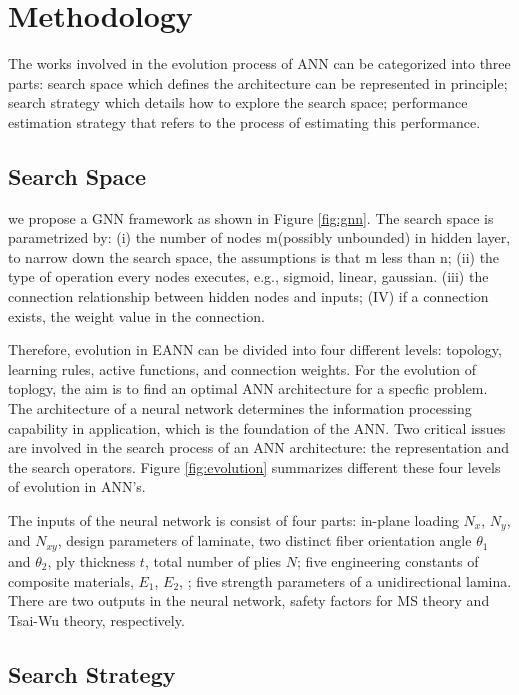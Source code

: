 \section{Methodology}
The works involved in the evolution process of ANN can be categorized into
three parts:  search space which defines the architecture can be represented in
principle; search strategy which details how to explore the search space;
performance estimation strategy that refers to the process of estimating this
performance.


\subsection{Search Space}

we propose a GNN framework as shown in Figure \ref{fig:gnn}. The search space
is parametrized by: (i) the number of nodes m(possibly unbounded) in hidden
layer, to narrow down the search space, the assumptions is that m less than n; (ii) the type of
operation every nodes executes, e.g., sigmoid, linear, gaussian. (iii) the
connection relationship between hidden nodes and inputs; (IV) if a connection
exists, the weight value in the connection.

Therefore, evolution in EANN can be divided into four different levels: topology, learning
rules, active functions, and connection weights. For the evolution of toplogy,
the aim is to find an optimal ANN architecture for a specfic problem. The
architecture of a neural network determines the information processing
capability in application, which is the foundation of the ANN. Two critical
issues are involved in the search process of an ANN architecture: the
representation and the search operators.
Figure \ref{fig:evolution} summarizes different these four levels of evolution in ANN's.

The inputs of the neural network is consist of four parts: in-plane loading
$N_x$, $N_y$, and $N_{xy}$, design parameters of laminate, two distinct fiber
orientation angle $\theta_1$ and $\theta_2$, ply thickness $t$, total number of
plies $N$; five engineering constants of composite materials, $E_1$, $E_2$, ;
five strength parameters of a unidirectional lamina. There are two outputs in
the neural network, safety factors for MS theory and Tsai-Wu theory, respectively.



\subsection{Search Strategy}

